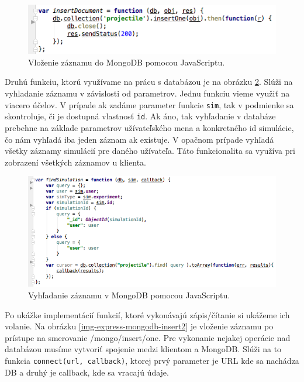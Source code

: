 \begin{figure}[H]
  \centering
  \includegraphics[scale=0.7]{img/code/express-mongo-insert.png}
  \caption{Vloženie záznamu do MongoDB pomocou JavaScriptu.}
  \label{img-express-mongo-insert}
\end{figure}

Druhú funkciu, ktorú využívame na prácu s databázou je na obrázku \ref{img-express-mongodb-find}. 
Slúži na vyhladanie záznamu v závislosti od parametrov. Jednu funkciu vieme využiť na viacero účelov. V prípade ak zadáme parameter funkcie \verb|sim|, tak v podmienke sa skontroluje, či je dostupná vlastnosť \verb|id|. Ak áno, tak vyhľadanie v databáze prebehne na základe parametrov užívateľského mena a konkretného id simulácie, čo nám vyhľadá iba jeden záznam ak existuje. V opačnom prípade vyhľadá všetky záznamy simulácií pre daného užívateľa. Táto funkcionalita sa využíva pri zobrazení všetkých záznamov u klienta.

\begin{figure}[H]
  \centering
  \includegraphics[scale=0.65]{img/code/express-mongodb-find.png}
  \caption{Vyhľadanie záznamu v MongoDB pomocou JavaScriptu.}
  \label{img-express-mongodb-find}
\end{figure}

Po ukážke implementácií funkcií, ktoré vykonávajú zápis/čítanie si ukážeme ich volanie. Na obrázku \ref{img-express-mongodb-insert2} je vloženie záznamu po prístupe na smerovanie /mongo/insert/one.
Pre vykonanie nejakej operácie nad databázou musíme vytvoriť spojenie medzi klientom a MongoDB. Slúži na to funkcia \verb|connect(url, callback)|, ktorej prvý parameter je URL kde sa nachádza DB a druhý je callback, kde sa vracajú údaje.

